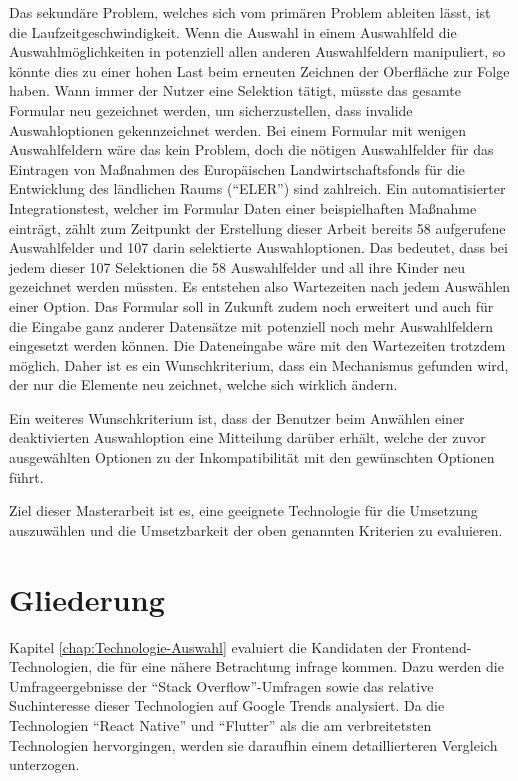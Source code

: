 Das sekundäre Problem,
welches sich vom primären Problem ableiten lässt,
ist die  Laufzeitgeschwindigkeit. 
Wenn die Auswahl in einem Auswahlfeld die Auswahlmöglichkeiten in potenziell allen anderen Auswahlfeldern manipuliert,
so könnte dies zu einer hohen Last beim erneuten Zeichnen der Oberfläche zur Folge haben.
Wann immer der Nutzer eine Selektion tätigt,
müsste das gesamte Formular neu gezeichnet werden,
um sicherzustellen,
dass invalide Auswahloptionen gekennzeichnet werden.
Bei einem  Formular mit wenigen Auswahlfeldern wäre das kein Problem,
doch die nötigen Auswahlfelder für das Eintragen von Maßnahmen des Europäischen Landwirtschaftsfonds für die Entwicklung des ländlichen Raums (\enquote{ELER}) sind zahlreich.
Ein  automatisierter Integrationstest,
welcher im Formular Daten einer beispielhaften Maßnahme einträgt,
zählt zum Zeitpunkt der Erstellung dieser Arbeit bereits 58 aufgerufene Auswahlfelder und 107 darin selektierte Auswahloptionen.
Das bedeutet,
dass bei jedem dieser 107 Selektionen die 58 Auswahlfelder und all ihre Kinder neu gezeichnet werden müssten.
Es entstehen also Wartezeiten nach jedem Auswählen einer Option.
Das Formular soll in Zukunft zudem noch erweitert und auch für die Eingabe ganz anderer Datensätze mit potenziell noch mehr Auswahlfeldern eingesetzt werden können.
Die Dateneingabe wäre mit den Wartezeiten trotzdem möglich.
Daher ist es ein Wunschkriterium, dass ein Mechanismus gefunden wird,
der nur die Elemente neu zeichnet, welche sich wirklich ändern.

Ein weiteres Wunschkriterium ist,
dass der Benutzer beim Anwählen einer deaktivierten Auswahloption eine Mitteilung darüber erhält,
welche der zuvor ausgewählten Optionen zu der Inkompatibilität mit den gewünschten Optionen führt.

Ziel dieser Masterarbeit ist es, eine geeignete Technologie für die Umsetzung auszuwählen
und die Umsetzbarkeit der  oben genannten Kriterien zu evaluieren.

\section{Gliederung}






Kapitel \ref{chap:Technologie-Auswahl} evaluiert die Kandidaten der Frontend-Technologien,
die für eine nähere Betrachtung infrage kommen.
Dazu werden die Umfrageergebnisse der \enquote{Stack Overflow}-Umfragen sowie das relative Suchinteresse dieser Technologien auf Google Trends analysiert.
Da die Technologien \enquote{React Native} und  \enquote{Flutter} als die am verbreitetsten Technologien hervorgingen,
werden sie daraufhin einem detaillierteren Vergleich unterzogen.

